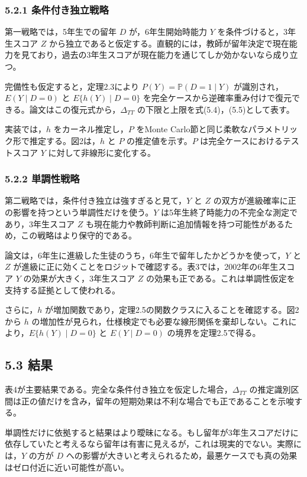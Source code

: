 \documentclass[10pt,a4paper]{article}
\newcommand{\Prb}{\mathbb{P}}
\begin{document}
\subsubsection{5.2.1 条件付き独立戦略}

第一戦略では，5年生での留年 $D$ が，6年生開始時能力 $Y$ を条件づけると，3年生スコア $Z$ から独立であると仮定する。直観的には，教師が留年決定で現在能力を見ており，過去の3年生スコアが現在能力を通じてしか効かないなら成り立つ。

完備性も仮定すると，定理2.3により $P(Y)=\Prb(D=1\mid Y)$ が識別され，$E(Y\mid D=0)$ と $E\{h(Y)\mid D=0\}$ を完全ケースから逆確率重み付けで復元できる。論文はこの復元式から，$\Delta_{TT}$ の下限と上限を式(5.4)，(5.5)として表す。

実装では，$h$ をカーネル推定し，$P$ をMonte Carlo節と同じ柔軟なパラメトリック形で推定する。図2は，$h$ と $P$ の推定値を示す。$P$ は完全ケースにおけるテストスコア $Y$ に対して非線形に変化する。

\subsubsection{5.2.2 単調性戦略}

第二戦略では，条件付き独立は強すぎると見て，$Y$ と $Z$ の双方が進級確率に正の影響を持つという単調性だけを使う。$Y$ は5年生終了時能力の不完全な測定であり，3年生スコア $Z$ も現在能力や教師判断に追加情報を持つ可能性があるため，この戦略はより保守的である。

論文は，6年生に進級した生徒のうち，6年生で留年したかどうかを使って，$Y$ と $Z$ が進級に正に効くことをロジットで確認する。表3では，2002年の6年生スコア $Y$ の効果が大きく，3年生スコア $Z$ の効果も正である。これは単調性仮定を支持する証拠として使われる。

さらに，$h$ が増加関数であり，定理2.5の関数クラスに入ることを確認する。図2から $h$ の増加性が見られ，仕様検定でも必要な線形関係を棄却しない。これにより，$E\{h(Y)\mid D=0\}$ と $E(Y\mid D=0)$ の境界を定理2.5で得る。

\subsection{5.3 結果}

表4が主要結果である。完全な条件付き独立を仮定した場合，$\Delta_{TT}$ の推定識別区間は正の値だけを含み，留年の短期効果は不利な場合でも正であることを示唆する。

単調性だけに依拠すると結果はより曖昧になる。もし留年が3年生スコアだけに依存していたと考えるなら留年は有害に見えるが，これは現実的でない。実際には，$Y$ の方が $D$ への影響が大きいと考えられるため，最悪ケースでも真の効果はゼロ付近に近い可能性が高い。
\end{document}
